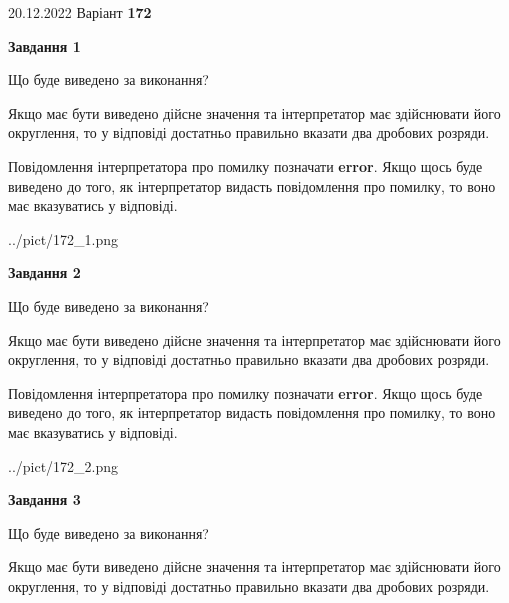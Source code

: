 \documentclass[12pt, ukrainian]{article}
\begin{document}
{20.12.2022 Варіант \No \textbf { 172 }\par}
{
\begin {Large}

{\begin {center}\textbf{Завдання 1}\end {center}}\par
Що буде виведено за виконання? \par

Якщо має бути виведено дійсне значення та інтерпретатор має здійснювати його округлення, 
то у відповіді достатньо правильно вказати два дробових розряди.

Повідомлення інтерпретатора про помилку позначати \textbf{error}.
Якщо щось буде виведено до того, як інтерпретатор видасть повідомлення про помилку, 
то воно має вказуватись у відповіді. \par

\begin{center}
	{../pict/172_1.png}
\end{center}
\newpage

{\begin {center}\textbf{Завдання 2}\end {center}}\par
Що буде виведено за виконання? \par

Якщо має бути виведено дійсне значення та інтерпретатор має здійснювати його округлення, 
то у відповіді достатньо правильно вказати два дробових розряди.

Повідомлення інтерпретатора про помилку позначати \textbf{error}.
Якщо щось буде виведено до того, як інтерпретатор видасть повідомлення про помилку, 
то воно має вказуватись у відповіді. \par

\begin{center}
	{../pict/172_2.png}
\end{center}
\newpage

{\begin {center}\textbf{Завдання 3}\end {center}}\par
Що буде виведено за виконання? \par

Якщо має бути виведено дійсне значення та інтерпретатор має здійснювати його округлення, 
то у відповіді достатньо правильно вказати два дробових розряди.


\end{Large}}
\end{document}
